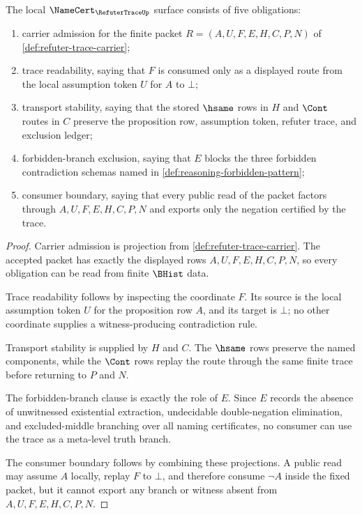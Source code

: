 \begin{theorem}
\label{thm:refuter-trace-namecert-obligations}
The local $\NameCert_{\RefuterTraceUp}$ surface consists of five obligations:
\begin{enumerate}
\item carrier admission for the finite packet $R=(A,U,F,E,H,C,P,N)$ of \autoref{def:refuter-trace-carrier};
\item trace readability, saying that $F$ is consumed only as a displayed route from the local assumption token $U$ for $A$ to $\bot$;
\item transport stability, saying that the stored $\hsame$ rows in $H$ and $\Cont$ routes in $C$ preserve the proposition row, assumption token, refuter trace, and exclusion ledger;
\item forbidden-branch exclusion, saying that $E$ blocks the three forbidden contradiction schemas named in \autoref{def:reasoning-forbidden-pattern};
\item consumer boundary, saying that every public read of the packet factors through $A,U,F,E,H,C,P,N$ and exports only the negation certified by the trace.
\end{enumerate}
\end{theorem}
\begin{proof}
Carrier admission is projection from \autoref{def:refuter-trace-carrier}. The accepted packet has exactly the displayed rows $A,U,F,E,H,C,P,N$, so every obligation can be read from finite $\BHist$ data.

Trace readability follows by inspecting the coordinate $F$. Its source is the local assumption token $U$ for the proposition row $A$, and its target is $\bot$; no other coordinate supplies a witness-producing contradiction rule.

Transport stability is supplied by $H$ and $C$. The $\hsame$ rows preserve the named components, while the $\Cont$ rows replay the route through the same finite trace before returning to $P$ and $N$.

The forbidden-branch clause is exactly the role of $E$. Since $E$ records the absence of unwitnessed existential extraction, undecidable double-negation elimination, and excluded-middle branching over all naming certificates, no consumer can use the trace as a meta-level truth branch.

The consumer boundary follows by combining these projections. A public read may assume $A$ locally, replay $F$ to $\bot$, and therefore consume $\neg A$ inside the fixed packet, but it cannot export any branch or witness absent from $A,U,F,E,H,C,P,N$.
\end{proof}

